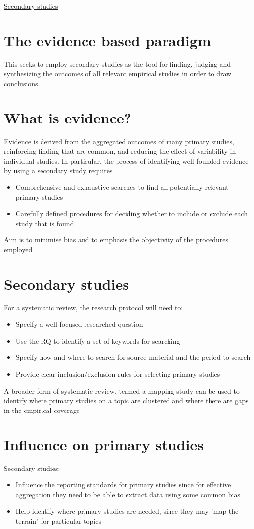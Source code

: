 \documentclass{article}[18pt]
\begin{document}
\begin{center}
\underline{\huge Secondary studies}
\end{center}
\section{The evidence based paradigm}
This seeks to employ secondary studies as the tool for finding, judging and synthesizing the outcomes of all relevant empirical studies in order to draw conclusions.
\section{What is evidence?}
Evidence is derived from the aggregated outcomes of many primary studies, reinforcing finding that are common, and reducing the effect of variability in individual studies. In particular, the process of identifying well-founded evidence by using a secondary study requires
\begin{itemize}
	\item Comprehensive and exhaustive searches to find all potentially relevant primary studies
	\item Carefully defined procedures for deciding whether to include or exclude each study that is found
\end{itemize}
Aim is to minimise bias and to emphasis the objectivity of the procedures employed
\section{Secondary studies}
For a systematic review, the research protocol will need to:
\begin{itemize}
	\item Specify a well focused researched question
	\item Use the RQ to identify a set of keywords for searching
	\item Specify how and where to search for source material and the period to search
	\item Provide clear inclusion/exclusion rules for selecting primary studies
\end{itemize}
A broader form of systematic review, termed a mapping study can be used to identify where primary studies on a topic are clustered and where there are gaps in the empirical coverage
\section{Influence on primary studies}
Secondary studies:
\begin{itemize}
	\item Influence the reporting standards for primary studies since for effective aggregation they need to be able to extract data using some common bias
	\item Help identify where primary studies are needed, since they may "map the terrain" for particular topics
\end{itemize}
\end{document}
